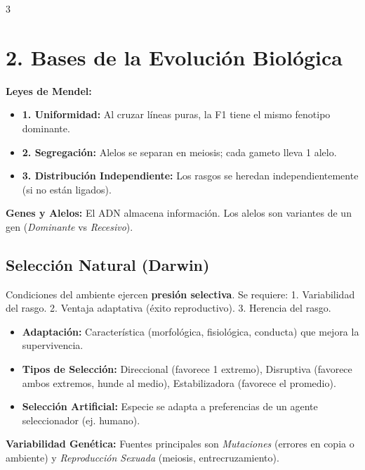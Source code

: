 \documentclass[9pt,letterpaper]{extarticle}
\begin{document}
\begin{multicols*}{3}
	\section*{2. Bases de la Evolución Biológica}
	\textbf{Leyes de Mendel:}
	\begin{itemize}
		\item \textbf{1. Uniformidad:} Al cruzar líneas puras, la F1 tiene el mismo fenotipo dominante.
		\item \textbf{2. Segregación:} Alelos se separan en meiosis; cada gameto lleva 1 alelo.
		\item \textbf{3. Distribución Independiente:} Los rasgos se heredan independientemente (si no están ligados).
	\end{itemize}
	\textbf{Genes y Alelos:} El ADN almacena información. Los alelos son variantes de un gen (\textit{Dominante} vs \textit{Recesivo}).

	\subsection*{Selección Natural (Darwin)}
	Condiciones del ambiente ejercen \textbf{presión selectiva}. Se requiere:
	1. Variabilidad del rasgo.
	2. Ventaja adaptativa (éxito reproductivo).
	3. Herencia del rasgo.
	\begin{itemize}
		\item \textbf{Adaptación:} Característica (morfológica, fisiológica, conducta) que mejora la supervivencia.
		\item \textbf{Tipos de Selección:} Direccional (favorece 1 extremo), Disruptiva (favorece ambos extremos, hunde al medio), Estabilizadora (favorece el promedio).
		\item \textbf{Selección Artificial:} Especie se adapta a preferencias de un agente seleccionador (ej. humano).
	\end{itemize}
	\textbf{Variabilidad Genética:} Fuentes principales son \textit{Mutaciones} (errores en copia o ambiente) y \textit{Reproducción Sexuada} (meiosis, entrecruzamiento).


\end{multicols*}
\end{document}
